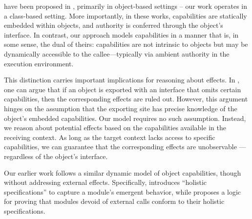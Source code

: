 
 {%
have been proposed in
 \cite{BirkedalL:caps-mmio-conf,ddd,vmsl-pldi2023,irisWasm23},   
 {primarily in object-based settings -- our work operates in a class-based setting.}
 More importantly, in these  works,  capabilities are statically embedded within objects, and authority is conferred through the object’s interface. In contrast, our approach models capabilities in a manner that is, in some sense, the dual of theirs: capabilities are not intrinsic to objects but may be 
 {dynamically accessible to the callee—typically via ambient authority in the execution environment.}}
 
 {This distinction carries important implications for reasoning  about   effects. 
 In  \cite{BirkedalL:caps-mmio-conf,ddd,vmsl-pldi2023,irisWasm23}, one can argue that if an object is exported with an interface that omits certain capabilities, then the corresponding effects are  ruled out. 
 However, this argument hinges on the assumption that the exporting site has precise knowledge of the object’s embedded capabilities.
 Our model requires no such assumption. Instead, we reason about potential effects based on the capabilities available in the receiving context.  
{As long as the target context lacks access to specific capabilities}, we can guarantee that the corresponding effects are unobservable —regardless of the object’s interface.
 }

 


{Our earlier work}  
{\cite{FASE,OOPSLA22}   follows a
similar dynamic model of object capabilities, though without addressing external effects.}
Specifically, \cite{FASE}  introduces “holistic specifications” to capture a module’s emergent behavior, while
\cite{OOPSLA22}  proposes
a logic for proving that modules devoid of external calls conform to their holistic specifications.



